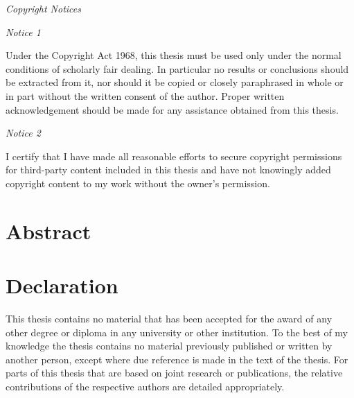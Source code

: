 \begin{center}
\begin{minipage}{0.95\textwidth}

\begin{center}
\textit{Copyright Notices}
\end{center}

{\textit{Notice 1}}

Under the Copyright Act 1968, this thesis must be used only under the normal conditions of scholarly fair dealing.
In particular no results or conclusions should be extracted from it, nor should it be copied or closely paraphrased in whole or in part without the written consent of the author.
Proper written acknowledgement should be made for any assistance obtained from this thesis.

\bigskip

{\textit {Notice 2}}

I certify that I have made all reasonable efforts to secure copyright permissions for third-party content included in this thesis and have not knowingly added copyright content to my work without the owner's permission.

\end{minipage}
\end{center}

\vspace*{\fill}
\vspace*{\fill}

\chapter*{Abstract}


\chapter*{Declaration}

This thesis contains no material that has been accepted for the award of any other degree or diploma in any university or other institution. To the best of my knowledge the thesis contains no material previously published or written by another person, except where due reference is made in the text of the thesis. For parts of this thesis that are based on joint research or publications, the relative contributions of the respective authors are detailed appropriately.

